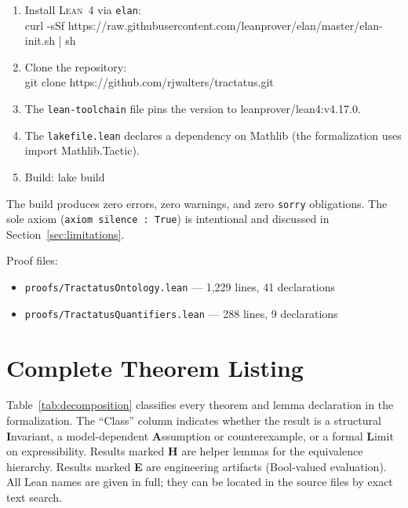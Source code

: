 \documentclass[10pt, letterpaper]{article}
\theoremstyle{definition}
\theoremstyle{remark}
\newcommand{\Lean}{\textsc{Lean}}
\begin{document}
\begin{enumerate}[nosep]
  \item Install \Lean~4 via \texttt{elan}:\\
    {\small\ttfamily curl -sSf https://raw.githubusercontent.com/\allowbreak{}leanprover/\allowbreak{}elan/\allowbreak{}master/\allowbreak{}elan-init.sh | sh}
  \item Clone the repository:\\
    {\small\ttfamily git clone https://github.com/rjwalters/tractatus.git}
  \item The \texttt{lean-toolchain} file pins the version to
    {\small\ttfamily leanprover/lean4:v4.17.0}.
  \item The \texttt{lakefile.lean} declares a dependency on
    Mathlib (the formalization uses
    {\small\ttfamily import Mathlib.Tactic}).
  \item Build: {\small\ttfamily lake build}
\end{enumerate}

\noindent
The build produces zero errors, zero warnings, and zero
\texttt{sorry} obligations.  The sole axiom
(\texttt{axiom silence : True}) is intentional and
discussed in Section~\ref{sec:limitations}.

Proof files:
\begin{itemize}[nosep]
  \item \texttt{proofs/TractatusOntology.lean} --- 1,229 lines, 41 declarations
  \item \texttt{proofs/TractatusQuantifiers.lean} --- 288 lines, 9 declarations
\end{itemize}

\section{Complete Theorem Listing}
\label{app:theorems}

Table~\ref{tab:decomposition} classifies every theorem and lemma
declaration in the formalization.  The ``Class'' column indicates
whether the result is a structural \textbf{I}nvariant,
a model-dependent \textbf{A}ssumption or counterexample, or a
formal \textbf{L}imit on expressibility.  Results marked
\textbf{H} are helper lemmas for the equivalence hierarchy.
Results marked \textbf{E} are engineering artifacts
(Bool-valued evaluation).  All Lean names are given in full;
they can be located in the source files by exact text search.
\end{document}
